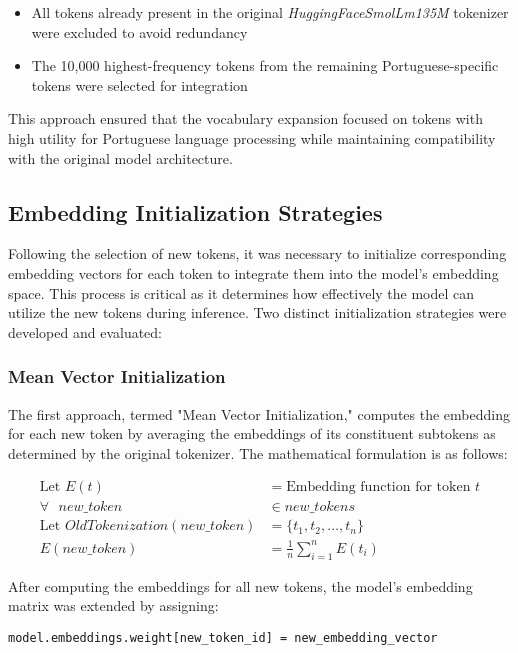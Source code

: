 \begin{itemize}
    \item All tokens already present in the original \textit{HuggingFaceSmolLm135M} tokenizer were excluded to avoid redundancy
    \item The 10,000 highest-frequency tokens from the remaining Portuguese-specific tokens were selected for integration
\end{itemize}

This approach ensured that the vocabulary expansion focused on tokens with high utility for Portuguese language processing while maintaining compatibility with the original model architecture.

\subsection{Embedding Initialization Strategies}
Following the selection of new tokens, it was necessary to initialize corresponding embedding vectors for each token to integrate them into the model's embedding space. This process is critical as it determines how effectively the model can utilize the new tokens during inference. Two distinct initialization strategies were developed and evaluated:

\subsubsection{Mean Vector Initialization}
The first approach, termed "Mean Vector Initialization," computes the embedding for each new token by averaging the embeddings of its constituent subtokens as determined by the original tokenizer. The mathematical formulation is as follows:

$$
\begin{aligned}
\text{Let } E(t) &= \text{Embedding function for token } t \\
\forall \text{ } new\_token &\in new\_tokens \\
\text{Let } OldTokenization(new\_token) &= \{t_1, t_2, \ldots, t_n\} \\
E(new\_token) &= \frac{1}{n}\sum_{i=1}^{n}E(t_i)
\end{aligned}
$$

After computing the embeddings for all new tokens, the model's embedding matrix was extended by assigning:

\begin{verbatim}
model.embeddings.weight[new_token_id] = new_embedding_vector
\end{verbatim}

